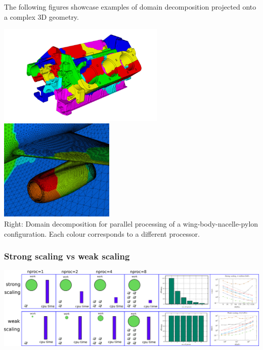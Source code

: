 The following figures showcase examples of domain decomposition projected 
onto a complex 3D geometry.

\begin{center}
\includegraphics[width=8cm]{images/parallel/engine}
\includegraphics[width=5.5cm]{images/parallel/wing}\\
{\captionfont Right: Domain decomposition for parallel processing of a wing-body-nacelle-pylon configuration.
Each colour corresponds to a different processor.}
\end{center}







\subsubsection{Strong scaling vs weak scaling}

\begin{center}
\includegraphics[width=16cm]{images/parallel/fig}
\end{center}


